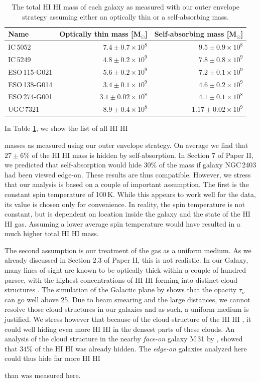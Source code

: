 \documentclass[useAMS,usenatbib]{mn2e}
\newcommand{\hi}{%
  \relax
  \ifmmode
    \textrm{\textsc{HI}}
  \else
    \textsc{H{\smaller}I}
  \fi
}
\begin{document}
\begin{table}
\centering
\begin{tabular}{l|rr}
 Name & Optically thin mass [M$_\odot$] & Self-absorbing mass [M$_\odot$]\\\hline\hline
 IC\,5052&$7.4\pm0.7\times10^8$&$9.5\pm0.9\times10^8$\\
 IC\,5249&$4.8\pm0.2\times10^9$& $7.8\pm0.8\times10^9$\\
 ESO\,115-G021&$5.6\pm0.2\times10^9$&$7.2\pm0.1\times10^9$\\
 ESO\,138-G014&$3.4\pm0.1\times10^9$&$4.6\pm0.2\times10^9$\\
 ESO\,274-G001&$3.1\pm0.02\times10^8$&$4.1\pm0.1\times10^8$\\
 UGC\,7321&$8.9\pm0.4\times10^8$&$1.17\pm0.02\times10^9$\\\hline\hline
\end{tabular}
\caption[Total \hi mass of galaxies]{The total \hi mass of each galaxy as measured with our outer envelope strategy assuming either an optically thin or a self-absorbing mass.}
\label{table:HImassmeasured}
\end{table}

In Table \ref{table:HImassmeasured}, we show the list of all \hi 
masses as measured using our outer envelope strategy.
On average we find that $27\pm6$\% of the \hi mass is hidden by 
self-absorption.
In Section 7 of Paper II, we predicted that 
self-absorption would hide 30\% of the mass if galaxy NGC\,2403 
had been viewed edge-on.
These results are thus compatible.
However, we stress that our analysis is based on a couple of 
important assumption.
The first is the constant spin temperature of 100\,K. 
While this appears to work well for the data, its value is 
chosen only for convenience.
In reality, the spin temperature is not constant, but is 
dependent on location inside the galaxy and the state of the \hi gas.
Assuming a  lower average spin temperature would have 
resulted in a much higher total \hi mass.

The second assumption is our treatment of the gas as a 
uniform medium.
As we already discussed in Section 2.3 of Paper II, 
this is not realistic. 
In our Galaxy, many lines of sight are known to be optically 
thick within a couple of hundred parsec, with the highest 
concentrations of \hi forming into distinct cloud structures 
\citep{Taylor2003,Allen2012A}.
The simulation of the Galactic plane by \citet{Douglas2010} 
shows that the opacity $\tau_\nu$ can go well above 25.
Due to beam smearing and the large distances, we cannot resolve those 
cloud structures in our galaxies and as such, a uniform medium is justified.
We stress however that because of the cloud structure of the \hi, it 
could well hiding even more \hi in the densest parts of these clouds.
An analysis of the cloud structure in the  nearby \emph{face-on} 
galaxy M\,31 by \citet{Braun2012A}, showed that $34\%$ of the \hi was
 already hidden. 
The \emph{edge-on} galaxies analyzed here could thus hide far more \hi 
than was measured here.
\end{document}
